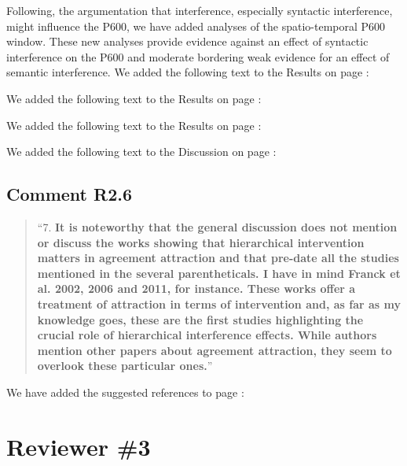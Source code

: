 \documentclass[12pt]{article}
\begin{document}

\vspace{1em}
\noindent Following, the argumentation that interference, especially syntactic interference, might influence the P600, we have added analyses of the spatio-temporal P600 window. These new analyses provide evidence against an effect of syntactic interference on the P600 and moderate bordering weak evidence for an effect of semantic interference. We added the following text to the Results on page \pageref{ERP_results1}:


\noindent We added the following text to the Results on page \pageref{ERP_results2}:


\noindent We added the following text to the Results on page \pageref{ERP_results3}:



\noindent We added the following text to the Discussion on page \pageref{ERP_discussion}:


\subsection*{Comment R2.6}
\begin{quote}
``7. \textbf{It is noteworthy that the general discussion does not mention or discuss the works showing that hierarchical intervention matters in agreement attraction and that pre-date all the studies mentioned in the several parentheticals. I have in mind Franck et al. 2002, 2006 and 2011, for instance. These works offer a treatment of attraction in terms of intervention and, as far as my knowledge goes, these are the first studies highlighting the crucial role of hierarchical interference effects. While authors mention other papers about agreement attraction, they seem to overlook these particular ones.}''
\end{quote}

We have added the suggested references to page \pageref{franck_refs}:


\section*{Reviewer \#3} 
\end{document}
